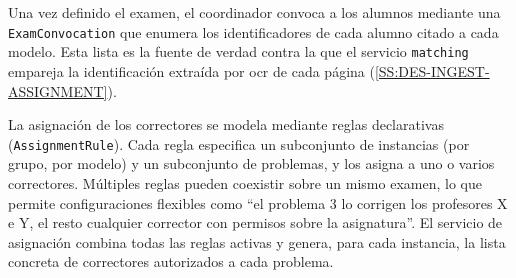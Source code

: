 Una vez definido el examen, el coordinador convoca a los alumnos
mediante una \texttt{ExamConvocation} que enumera los identificadores
de cada alumno citado a cada modelo. Esta lista es la fuente de verdad
contra la que el servicio \texttt{matching} empareja la identificación
extraída por \acs{ocr} de cada página
(\cref{SS:DES-INGEST-ASSIGNMENT}).

La asignación de los correctores se modela mediante reglas declarativas
(\texttt{AssignmentRule}). Cada regla especifica un subconjunto de
instancias (por grupo, por modelo) y un subconjunto de problemas, y
los asigna a uno o varios correctores. Múltiples reglas pueden coexistir
sobre un mismo examen, lo que permite configuraciones flexibles como
``el problema 3 lo corrigen los profesores X e Y, el resto cualquier
corrector con permisos sobre la asignatura''. El servicio de asignación
combina todas las reglas activas y genera, para cada instancia, la
lista concreta de correctores autorizados a cada problema.
